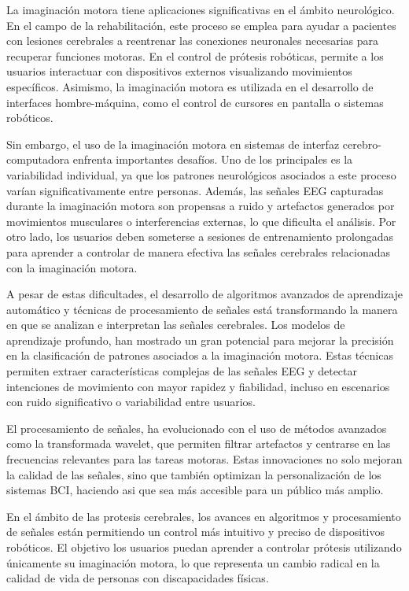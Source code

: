 La imaginación motora tiene aplicaciones significativas en el ámbito neurológico. En el campo de la rehabilitación, este proceso se emplea para ayudar a pacientes con lesiones cerebrales a reentrenar las conexiones neuronales necesarias para recuperar funciones motoras. En el control de prótesis robóticas, permite a los usuarios interactuar con dispositivos externos visualizando movimientos específicos. Asimismo, la imaginación motora es utilizada en el desarrollo de interfaces hombre-máquina, como el control de cursores en pantalla o sistemas robóticos.

Sin embargo, el uso de la imaginación motora en sistemas de interfaz cerebro-computadora enfrenta importantes desafíos. Uno de los principales es la variabilidad individual, ya que los patrones neurológicos asociados a este proceso varían significativamente entre personas. Además, las señales EEG capturadas durante la imaginación motora son propensas a ruido y artefactos generados por movimientos musculares o interferencias externas, lo que dificulta el análisis. Por otro lado, los usuarios deben someterse a sesiones de entrenamiento prolongadas para aprender a controlar de manera efectiva las señales cerebrales relacionadas con la imaginación motora.

A pesar de estas dificultades, el desarrollo de algoritmos avanzados de aprendizaje automático y técnicas de procesamiento de señales está transformando la manera en que se analizan e interpretan las señales cerebrales. Los modelos de aprendizaje profundo, han mostrado un gran potencial para mejorar la precisión en la clasificación de patrones asociados a la imaginación motora. Estas técnicas permiten extraer características complejas de las señales EEG y detectar intenciones de movimiento con mayor rapidez y fiabilidad, incluso en escenarios con ruido significativo o variabilidad entre usuarios.

El procesamiento de señales, ha evolucionado con el uso de métodos avanzados como la transformada wavelet, que permiten filtrar artefactos y centrarse en las frecuencias relevantes para las tareas motoras. Estas innovaciones no solo mejoran la calidad de las señales, sino que también optimizan la personalización de los sistemas BCI, haciendo asi que sea más accesible para un público más amplio.

En el ámbito de las protesis cerebrales, los avances en algoritmos y procesamiento de señales están permitiendo un control más intuitivo y preciso de dispositivos robóticos. El objetivo los usuarios puedan aprender a controlar prótesis utilizando únicamente su imaginación motora, lo que representa un cambio radical en la calidad de vida de personas con discapacidades físicas. 

